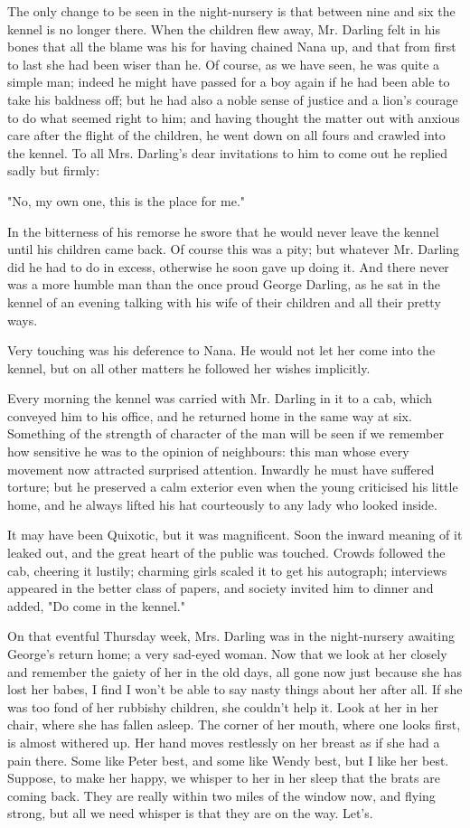 The only change to be seen in the night-nursery is that between nine and
six the kennel is no longer there. When the children flew away, Mr.
Darling felt in his bones that all the blame was his for having chained
Nana up, and that from first to last she had been wiser than he. Of
course, as we have seen, he was quite a simple man; indeed he might have
passed for a boy again if he had been able to take his baldness off; but
he had also a noble sense of justice and a lion's courage to do what
seemed right to him; and having thought the matter out with anxious care
after the flight of the children, he went down on all fours and crawled
into the kennel. To all Mrs. Darling's dear invitations to him to come out
he replied sadly but firmly:


"No, my own one, this is the place for me."


In the bitterness of his remorse he swore that he would never leave the
kennel until his children came back. Of course this was a pity; but
whatever Mr. Darling did he had to do in excess, otherwise he soon gave up
doing it. And there never was a more humble man than the once proud George
Darling, as he sat in the kennel of an evening talking with his wife of
their children and all their pretty ways.


Very touching was his deference to Nana. He would not let her come into
the kennel, but on all other matters he followed her wishes implicitly.


Every morning the kennel was carried with Mr. Darling in it to a cab,
which conveyed him to his office, and he returned home in the same way at
six. Something of the strength of character of the man will be seen if we
remember how sensitive he was to the opinion of neighbours: this man whose
every movement now attracted surprised attention. Inwardly he must have
suffered torture; but he preserved a calm exterior even when the young
criticised his little home, and he always lifted his hat courteously to
any lady who looked inside.


It may have been Quixotic, but it was magnificent. Soon the inward meaning
of it leaked out, and the great heart of the public was touched. Crowds
followed the cab, cheering it lustily; charming girls scaled it to get his
autograph; interviews appeared in the better class of papers, and society
invited him to dinner and added, "Do come in the kennel."


On that eventful Thursday week, Mrs. Darling was in the night-nursery
awaiting George's return home; a very sad-eyed woman. Now that we look at
her closely and remember the gaiety of her in the old days, all gone now
just because she has lost her babes, I find I won't be able to say nasty
things about her after all. If she was too fond of her rubbishy children,
she couldn't help it. Look at her in her chair, where she has fallen
asleep. The corner of her mouth, where one looks first, is almost withered
up. Her hand moves restlessly on her breast as if she had a pain there.
Some like Peter best, and some like Wendy best, but I like her best.
Suppose, to make her happy, we whisper to her in her sleep that the brats
are coming back. They are really within two miles of the window now, and
flying strong, but all we need whisper is that they are on the way. Let's.


